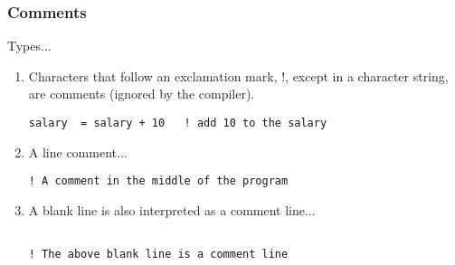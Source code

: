 \documentclass[xcolor=dvipsnames,dvip,notes=show,table]{beamer}
\begin{document}
% 
% 
\begin{frame}[fragile]
\frametitle{Comments}
\scriptsize
\begin{block}{Types...}
\begin{enumerate}
 \item Characters that follow an exclamation mark, !, except in a character string, are comments (ignored by the compiler).

 \begin{lstlisting}
salary  = salary + 10   ! add 10 to the salary
 \end{lstlisting}

 \item A line comment...
  \begin{lstlisting}
! A comment in the middle of the program
 \end{lstlisting}
 
 \item A blank line is also interpreted as a comment line...
   \begin{lstlisting}

! The above blank line is a comment line
 \end{lstlisting}
 
 
\end{enumerate}

\end{block}


\end{frame}
% 
% 
\end{document}
